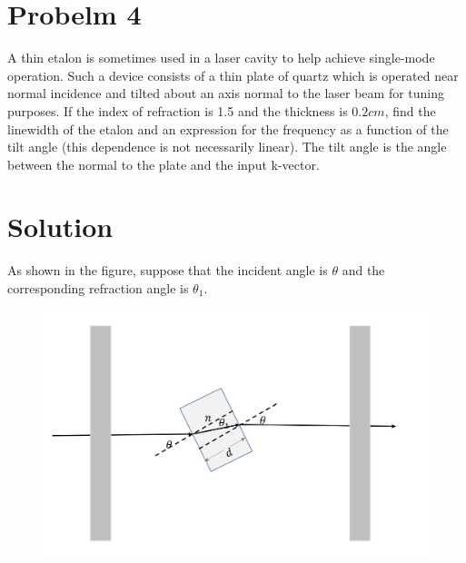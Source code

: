 \documentclass{article}
\begin{document}
\section{Probelm 4}
A thin etalon is sometimes used in a laser cavity to help achieve single-mode operation. Such a device consists of a thin plate of quartz which is operated near normal incidence and tilted about an axis normal to the laser beam for tuning purposes. If the index of refraction is 1.5 and the thickness is $0.2cm$, find the linewidth of the etalon and an expression for the frequency as a function of the tilt angle (this dependence is not necessarily linear). The tilt angle is the angle between the normal to the plate and the input k-vector.
\section*{Solution}
As shown in the figure, suppose that the incident angle is $\theta$ and the corresponding refraction angle is $\theta_1$.

\begin{figure}[htb]
	\centering
	\includegraphics[width=0.8\linewidth]{f4}
	\label{fig:f2}
\end{figure}
\end{document}
